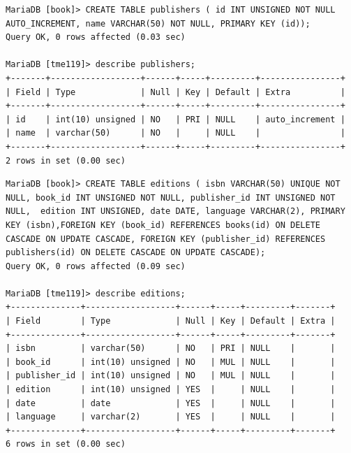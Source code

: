 \documentclass{assignment}
\begin{document}
\begin{verbatim}
MariaDB [book]> CREATE TABLE publishers ( id INT UNSIGNED NOT NULL AUTO_INCREMENT, name VARCHAR(50) NOT NULL, PRIMARY KEY (id));
Query OK, 0 rows affected (0.03 sec)

MariaDB [tme119]> describe publishers;
+-------+------------------+------+-----+---------+----------------+
| Field | Type             | Null | Key | Default | Extra          |
+-------+------------------+------+-----+---------+----------------+
| id    | int(10) unsigned | NO   | PRI | NULL    | auto_increment |
| name  | varchar(50)      | NO   |     | NULL    |                |
+-------+------------------+------+-----+---------+----------------+
2 rows in set (0.00 sec)
\end{verbatim}

\begin{verbatim}
MariaDB [book]> CREATE TABLE editions ( isbn VARCHAR(50) UNIQUE NOT NULL, book_id INT UNSIGNED NOT NULL, publisher_id INT UNSIGNED NOT NULL,  edition INT UNSIGNED, date DATE, language VARCHAR(2), PRIMARY KEY (isbn),FOREIGN KEY (book_id) REFERENCES books(id) ON DELETE CASCADE ON UPDATE CASCADE, FOREIGN KEY (publisher_id) REFERENCES publishers(id) ON DELETE CASCADE ON UPDATE CASCADE);
Query OK, 0 rows affected (0.09 sec)

MariaDB [tme119]> describe editions;
+--------------+------------------+------+-----+---------+-------+
| Field        | Type             | Null | Key | Default | Extra |
+--------------+------------------+------+-----+---------+-------+
| isbn         | varchar(50)      | NO   | PRI | NULL    |       |
| book_id      | int(10) unsigned | NO   | MUL | NULL    |       |
| publisher_id | int(10) unsigned | NO   | MUL | NULL    |       |
| edition      | int(10) unsigned | YES  |     | NULL    |       |
| date         | date             | YES  |     | NULL    |       |
| language     | varchar(2)       | YES  |     | NULL    |       |
+--------------+------------------+------+-----+---------+-------+
6 rows in set (0.00 sec)
\end{verbatim}
\end{document}
